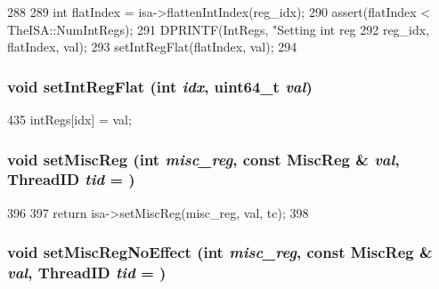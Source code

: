 \begin{DoxyCode}
288     {
289         int flatIndex = isa->flattenIntIndex(reg_idx);
290         assert(flatIndex < TheISA::NumIntRegs);
291         DPRINTF(IntRegs, "Setting int reg %
292                 reg_idx, flatIndex, val);
293         setIntRegFlat(flatIndex, val);
294     }
\end{DoxyCode}
\hypertarget{classSimpleThread_ae3b8c9c2c1ae95767f0703357957a3f8}{
\subsubsection[{setIntRegFlat}]{\setlength{\rightskip}{0pt plus 5cm}void setIntRegFlat (int {\em idx}, \/  uint64\_\-t {\em val})}}
\label{classSimpleThread_ae3b8c9c2c1ae95767f0703357957a3f8}



\begin{DoxyCode}
435 { intRegs[idx] = val; }
\end{DoxyCode}
\hypertarget{classSimpleThread_a9b618db833e56fbb32246fe25716846f}{
\subsubsection[{setMiscReg}]{\setlength{\rightskip}{0pt plus 5cm}void setMiscReg (int {\em misc\_\-reg}, \/  const {\bf MiscReg} \& {\em val}, \/  {\bf ThreadID} {\em tid} = {})}}
\label{classSimpleThread_a9b618db833e56fbb32246fe25716846f}



\begin{DoxyCode}
396     {
397         return isa->setMiscReg(misc_reg, val, tc);
398     }
\end{DoxyCode}
\hypertarget{classSimpleThread_ab8dd4afdd4e652ca191b235505691f68}{
\subsubsection[{setMiscRegNoEffect}]{\setlength{\rightskip}{0pt plus 5cm}void setMiscRegNoEffect (int {\em misc\_\-reg}, \/  const {\bf MiscReg} \& {\em val}, \/  {\bf ThreadID} {\em tid} = {})}}
\label{classSimpleThread_ab8dd4afdd4e652ca191b235505691f68}



